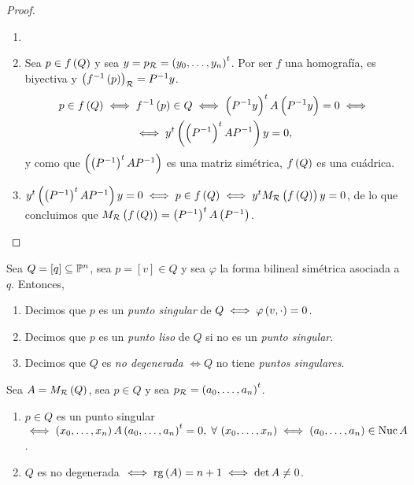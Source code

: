 \begin{proof}
    \begin{enumerate}[(1)] \item[]
        \item Sea $p \in f \left( Q \right)$ y sea $y=p_{\mathcal{R}} = \left( y_0 , \dots , y_n \right) ^t$. Por ser $f$ una homografía, es biyectiva y $\left( f ^{-1} \left( p \right) \right) _{\mathcal{R}} = P^{-1} y$.
            \begin{gather*}
                p \in f \left( Q \right) \iff f^{-1} \left( p \right) \in Q \iff \left( P^{-1} y \right) ^t A \left( P^{-1} y \right) = 0 \iff \\
                \iff y^t \left( \left( P ^{-1} \right) ^t A P^{-1} \right) y = 0 ,
            \end{gather*}
            y como que $\left( \left( P ^{-1} \right) ^t A P^{-1} \right)$ es una matriz simétrica, $f \left( Q \right)$ es una cuádrica.
        \item $y^t \left( \left( P ^{-1} \right) ^t A P^{-1} \right) y = 0 \iff p \in f \left( Q \right) \iff y^t M_{\mathcal{R}} \left( f \left( Q \right) \right) y = 0$, de lo que concluimos que $M_{\mathcal{R}} \left( f \left( Q \right) \right) = \left( P^{-1} \right) ^t A \left( P^{-1} \right)$.
    \end{enumerate}
\end{proof}

\begin{defi}
    Sea $Q=\left[ q \right] \subseteq \mathbb{P} ^n$, sea $p = \left[ v \right] \in Q$ y sea $\varphi$ la forma bilineal simétrica asociada a $q$. Entonces, 
    \begin{enumerate}[(1)] 
        \item Decimos que $p$ es un \textit{punto singular} de $Q \iff \varphi \left( v, \cdot \right) = 0$.
        \item Decimos que $p$ es un \textit{punto liso} de $Q$ si no es un \textit{punto singular}.
        \item Decimos que $Q$ es \textit{no degenerada} $\iff Q$ no tiene \textit{puntos singulares}. 
    \end{enumerate}
\end{defi}

\begin{obs}
    Sea $A=M_{\mathcal{R}} \left( Q \right)$, sea $p \in Q$ y sea $p_{\mathcal{R}} = \left( a_0, \dots , a_n \right) ^t$.
    \begin{enumerate}[(1)]
        \item $p\in Q$ es un punto singular $\iff \left( x_0, \dots , x_n \right) A \left( a_0, \dots , a_n \right) ^t = 0, \; \forall \, \left( x_0, \dots , x_n \right) \iff \left( a_0, \dots , a_n \right) \in \operatorname{Nuc} A$.
        \item $Q$ es no degenerada $\iff \operatorname{rg} \left( A \right) = n+1 \iff \det A \neq 0$.
    \end{enumerate}
\end{obs}



